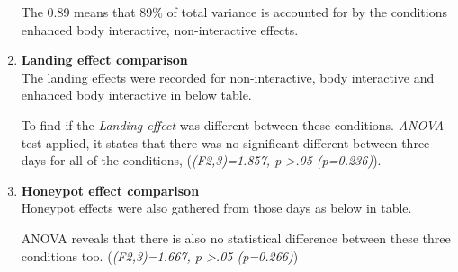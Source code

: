 \begin{enumerate}
The 0.89 means that 89\% of total variance is accounted for by the conditions enhanced body interactive, non-interactive effects.




\item \textbf{Landing effect comparison}\\
The landing effects were recorded for non-interactive, body interactive and enhanced body interactive in below table.

\begin{table}[H]
\caption{Cross tabulation for each condition Landing effect }
\label{tab:newbodylandingeffect}
\centering
{}
\end{table}
To find if the \emph{Landing effect} was different between these conditions. \emph{ANOVA} test applied, it states that there was no significant different between three days for all of the conditions, 
(\emph{(F2,3)=1.857, p >.05 (p=0.236)}).


\item \textbf{Honeypot effect comparison}\\
Honeypot effects were also gathered from those days as below in table.

\begin{table}[H]
\caption{Cross tabulation for each condition Honeypot effect }
\label{tab:newbodyhoneypoteffect}
\centering
{}
\end{table}

ANOVA reveals that there is also no statistical difference between these three conditions too. 
(\emph{(F2,3)=1.667, p >.05 (p=0.266)})



\end{enumerate}

